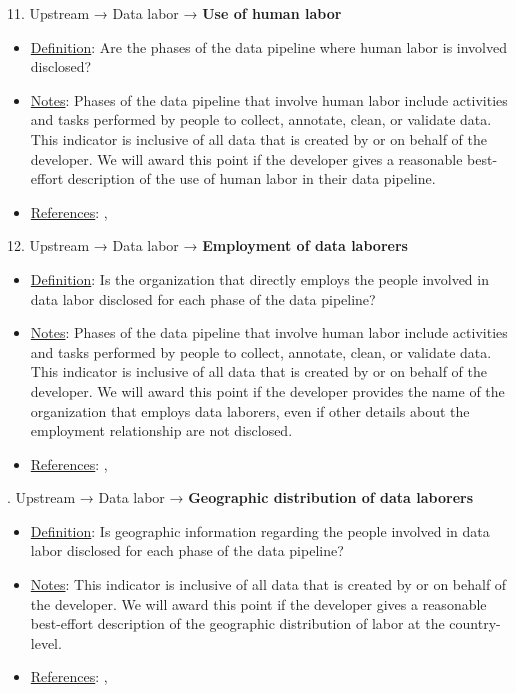 11. Upstream → Data labor → \textbf{Use of human labor}
\vspace{-\parskip}
\begin{itemize}
	\item
	\underline{Definition}: Are the phases of the data pipeline where human labor is involved disclosed?
	\item
	\underline{Notes}: Phases of the data pipeline that involve human labor include activities and tasks performed by people to collect, annotate, clean, or validate data. This indicator is inclusive of all data that is created by or on behalf of the developer. We will award this point if the developer gives a reasonable best-effort description of the use of human labor in their data pipeline.
	\item
	\underline{References}: \citet{kittur2013future}, \citet{dzieza2023ai}
\end{itemize}


12. Upstream → Data labor → \textbf{Employment of data laborers}
\vspace{-\parskip}
\begin{itemize}
	\item
	\underline{Definition}: Is the organization that directly employs the people involved in data labor disclosed for each phase of the data pipeline?
	\item
	\underline{Notes}: Phases of the data pipeline that involve human labor include activities and tasks performed by people to collect, annotate, clean, or validate data. This indicator is inclusive of all data that is created by or on behalf of the developer. We will award this point if the developer provides the name of the organization that employs data laborers, even if other details about the employment relationship are not disclosed.
	\item
	\underline{References}: \citet{kittur2013future}, \citet{dzieza2023ai}
\end{itemize}


. Upstream → Data labor → \textbf{Geographic distribution of data laborers}
\vspace{-\parskip}
\begin{itemize}
	\item
	\underline{Definition}: Is geographic information regarding the people involved in data labor disclosed for each phase of the data pipeline?
	\item
	\underline{Notes}: This indicator is inclusive of all data that is created by or on behalf of the developer. We will award this point if the developer gives a reasonable best-effort description of the geographic distribution of labor at the country-level.
	\item
	\underline{References}: \citet{hao2023cleaning}, \citet{gray2019ghost}
\end{itemize}


